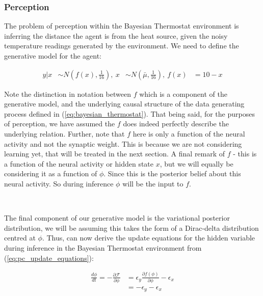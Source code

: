\documentclass{article}
\newcommand{\refp}[1]{(\ref{#1})}
\begin{document}
\subsubsection{Perception}

The problem of perception within the Bayesian Thermostat environment is inferring the distance the agent is from the heat source, given the noisy temperature readings generated by the environment. We need to define the generative model for the agent:

\begin{equation}\label{eq:bayesian_thermostat_generative_model}
	\begin{aligned}
		y | x &\sim N\left(f(x), \frac{1}{16}\right), \  x &\sim N\left(\bar{\mu}, \frac{1}{16}\right) ,\ f(x) &= 10 - x
	\end{aligned}
\end{equation}

Note the distinction in notation between $f$ which is a component of the generative model, and the underlying causal structure of the data generating process defined in \refp{eq:bayesian_thermostat}. That being said, for the purposes of perception, we have assumed the $f$ does indeed perfectly describe the underlying relation. Further, note that $f$ here is only a function of the neural activity and not the synaptic weight. This is because we are not considering learning yet, that will be treated in the next section. A final remark of $f$ - this is a function of the neural activity or hidden state $x$, but we will equally be considering it as a function of $\phi$. Since this is the posterior belief about this neural activity. So during inference $\phi$ will be the input to $f$. 

\

The final component of our generative model is the variational posterior distribution, we will be assuming this takes the form of a Dirac-delta distribution centred at $\phi$. Thus, can now derive the update equations for the hidden variable during inference in the Bayesian Thermostat environment from \refp{eq:pc_update_equations}: 

\begin{equation}\label{eq:pc_perception_phi}
	\begin{aligned}
		\frac{d \phi}{dt} = -\frac{\partial \mathcal{F}}{\partial \phi} &= \epsilon_y \frac{\partial f(\phi)}{\partial \phi} - \epsilon_x \\
		&= -\epsilon_y - \epsilon_x \\
    \end{aligned}
\end{equation}
\end{document}
